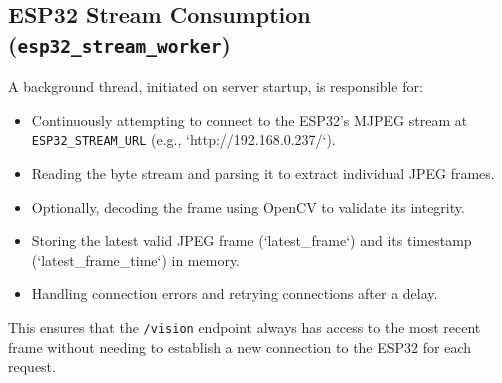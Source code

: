 \documentclass[12pt, a4paper]{report}
\begin{document}
\subsection{ESP32 Stream Consumption (\texttt{esp32\_stream\_worker})}
A background thread, initiated on server startup, is responsible for:
\begin{itemize}
    \item Continuously attempting to connect to the ESP32's MJPEG stream at \texttt{ESP32\_STREAM\_URL} (e.g., `http://192.168.0.237/`).
    \item Reading the byte stream and parsing it to extract individual JPEG frames.
    \item Optionally, decoding the frame using OpenCV to validate its integrity.
    \item Storing the latest valid JPEG frame (`latest\_frame`) and its timestamp (`latest\_frame\_time`) in memory.
    \item Handling connection errors and retrying connections after a delay.
\end{itemize}
This ensures that the \texttt{/vision} endpoint always has access to the most recent frame without needing to establish a new connection to the ESP32 for each request.
\end{document}
